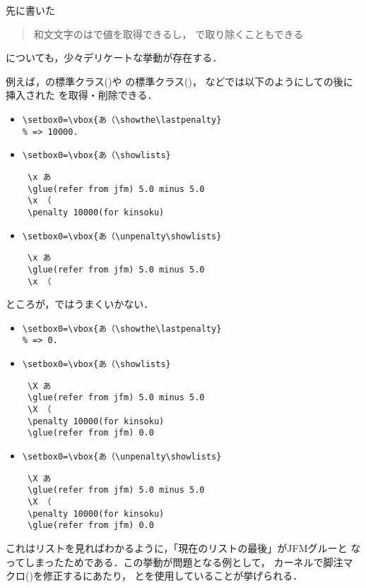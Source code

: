 \documentclass[paper=a4,twocolumn,line_length=24zw,number_of_lines=43]{jlreq}
\begin{document}
先に書いた
\begin{quote}
和文文字のはで値を取得できるし，
で取り除くこともできる
\end{quote}
についても，少々デリケートな挙動が存在する．

例えば，\pLaTeX の標準クラス()や
\upLaTeX の標準クラス()，
などでは以下のようにしての後に挿入された
を取得・削除できる．
\begin{itemize}
  \item \verb+\setbox0=\vbox{あ（\showthe\lastpenalty}+\\
    \verb+% => 10000.+
  \item \verb+\setbox0=\vbox{あ（\showlists}+
\begin{verbnote}
\begin{verbatim}
 \x あ
 \glue(refer from jfm) 5.0 minus 5.0
 \x （
 \penalty 10000(for kinsoku)
\end{verbatim}
\end{verbnote}
  \item \verb+\setbox0=\vbox{あ（\unpenalty\showlists}+
\begin{verbnote}
\begin{verbatim}
 \x あ
 \glue(refer from jfm) 5.0 minus 5.0
 \x （
\end{verbatim}
\end{verbnote}
\end{itemize}

ところが，ではうまくいかない．
\begin{itemize}
  \item \verb+\setbox0=\vbox{あ（\showthe\lastpenalty}+\\
    \verb+% => 0.+
  \item \verb+\setbox0=\vbox{あ（\showlists}+
\begin{verbnote}
\begin{verbatim}
 \X あ
 \glue(refer from jfm) 5.0 minus 5.0
 \X （
 \penalty 10000(for kinsoku)
 \glue(refer from jfm) 0.0
\end{verbatim}
\end{verbnote}
  \item \verb+\setbox0=\vbox{あ（\unpenalty\showlists}+
\begin{verbnote}
\begin{verbatim}
 \X あ
 \glue(refer from jfm) 5.0 minus 5.0
 \X （
 \penalty 10000(for kinsoku)
 \glue(refer from jfm) 0.0
\end{verbatim}
\end{verbnote}
\end{itemize}
これはリストを見ればわかるように，「現在のリストの最後」がJFMグルーと
なってしまったためである\cite{build67}．この挙動が問題となる例として，
\pLaTeX カーネルで脚注マクロ()を修正するにあたり，
とを使用していることが挙げられる．
\end{document}
